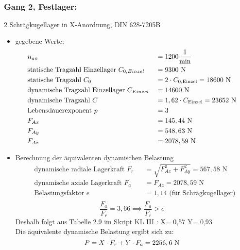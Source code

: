 \subsubsection{Gang 2, Festlager:} 2 Schrägkugellager in X-Anordnung, DIN 628-7205B\\
\begin{itemize}
	\item gegebene Werte:
	\begin{align*}
	&n_{an}&&= 1200 \frac{1}{\text{min}} \\
	&\text{statische Tragzahl Einzellager } C_{0,Einzel} &&= 9300 \text{ N}\\
	&\text{statische Tragzahl } C_0 &&= 2 \cdot C_{0,\text{Einzel}} = 18600 \text{ N} \\
	&\text{dynamische Tragzahl Einzellager } C_{Einzel} &&= 14600 \text{ N} \\
	&\text{dynamische Tragzahl } C &&= 1,62 \cdot C_{\text{Einzel}} = 23652 \text{ N}\\
	&\text{Lebensdauerexponent } p&&= 3  \\
	&F_{Ax} && = 145,44 \text{ N}\\
	&F_{Ay} && = 548,63 \text{ N}\\
	&F_{Az} && = 2078,59 \text{ N}\\
	\end{align*} 
	\item Berechnung der äquivalenten dynamischen Belastung
	\begin{align*}
	&\text{dynamische radiale Lagerkraft } F_r&& = \sqrt{F_{Ax}^2 + F_{Ay}^2 } = 567,58 \text{ N} \\
	&\text{dynamische axiale Lagerkraft } F_a&& = F_{Az} = 2078,59 \text{ N}\\
	&\text{Belastungsfaktor } e &&= 1,14 \text{ (für Schrägkugellager)} \\
	\end{align*} 
	\[\frac{F_a}{F_r}= 3,66 \implies \frac{F_a}{F_r} > e\]
	Deshalb folgt aus Tabelle 2.9 im Skript KL III : X= 0,57 \text{, } Y= 0,93 \\
	Die äquivalente dynamische Belastung ergibt sich zu: 
	\[
		P= X \cdot F_r + Y \cdot F_a = 2256,6 \text{ N}
	\]
\end{itemize}
\newpage

